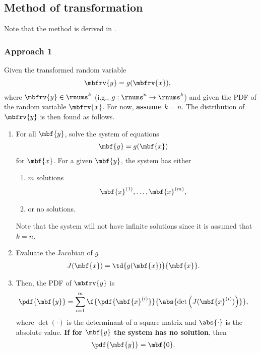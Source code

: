 \subsection{Method of transformation}
Note that the method is derived in \cite[Sec.~2.6.2]{MachineLearningProbabilistic2012}. 
\subsubsection{Approach 1}
\label{sec: MV method of transformation approach 1}
\begin{myBlackBox}
    Given the transformed random variable    
    \begin{align}
        \mbfrv{y} &= g(\mbfrv{x}),
    \end{align}
    where $\mbfrv{y}\in\rnums^{k}$ (i.g., $g:\rnums^{n}\to\rnums^{k}$) and given the PDF of the random variable $\mbfrv{x}$. For now, \textbf{assume $k=n$}. The distribution of $\mbfrv{y}$ is then found as follows.
    \begin{enumerate}
        \item For all $\mbf{y}$, solve the system of equations
        \begin{align}
            \mbf{y} &= g(\mbf{x})
        \end{align}
        for $\mbf{x}$. For a given $\mbf{y}$, the system has either
        \begin{enumerate}
            \item $m$ solutions
            \begin{align}
                \mbf{x}^{(1)}, \ldots, \mbf{x}^{(m)},
            \end{align}
            \item or no solutions.
        \end{enumerate}
        Note that the system will not have infinite solutions since it is assumed that $k=n$.
        \item Evaluate the Jacobian of $g$
        \begin{align}
            J(\mbf{x})                         
            &= \td{g(\mbf{x})}{\mbf{x}}.
        \end{align}
        \item Then, the PDF of $\mbfrv{y}$ is
        \begin{align}
            \pdf{\mbf{y}} &= 
            \sum_{i=1}^{m} \f{\pdf{\mbf{x}^{(i)}}}{\abs{\operatorname{det}\left(J(\mbf{x}^{(i)})\right)}},
        \end{align}
        where $\operatorname{det}(\cdot)$ is the determinant of a square matrix and $\abs{\cdot}$ is the absolute value. \textbf{If for $\mbf{y}$ the system has no solution}, then 
        \begin{align}
            \pdf{\mbf{y}} &= \mbf{0}.
        \end{align}
    \end{enumerate}
\end{myBlackBox}
